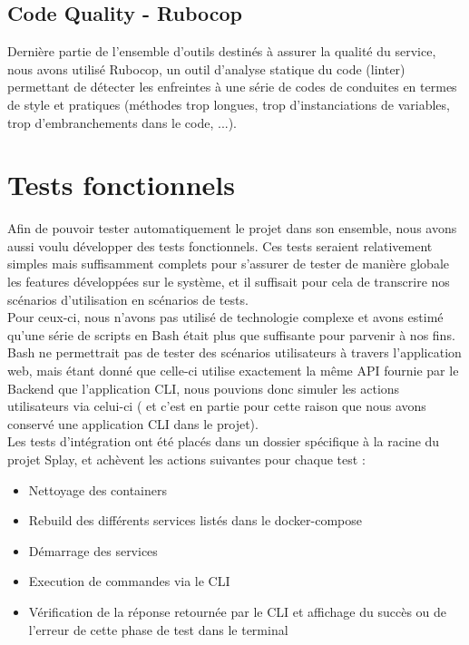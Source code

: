 \documentclass{eplmastersthesis}
\begin{document}
      \subsection{Code Quality - Rubocop}

        Dernière partie de l'ensemble d'outils destinés à assurer la qualité du
        service, nous avons utilisé Rubocop, un outil d'analyse statique du code
        (linter) permettant de détecter les enfreintes à une série de codes
        de conduites en termes de style et pratiques (méthodes trop longues,
        trop d'instanciations de variables, trop d'embranchements dans le code, ...).

    \section{Tests fonctionnels}

      Afin de pouvoir tester automatiquement le projet dans son ensemble, nous
      avons aussi voulu développer des tests fonctionnels. Ces tests seraient
      relativement simples mais suffisamment complets pour s'assurer de
      tester de manière globale les features développées sur le système, et
      il suffisait pour cela de transcrire nos scénarios d'utilisation en
      scénarios de tests.\\

      Pour ceux-ci, nous n'avons pas utilisé de technologie complexe et avons
      estimé qu'une série de scripts en Bash était plus que suffisante pour
      parvenir à nos fins. Bash ne permettrait pas de tester des scénarios
      utilisateurs à travers l'application web, mais étant donné que celle-ci
      utilise exactement la même API fournie par le Backend que l'application
      CLI, nous pouvions donc simuler les actions utilisateurs via celui-ci (
      et c'est en partie pour cette raison que nous avons conservé une
      application CLI dans le projet).\\

      Les tests d'intégration ont été placés dans un dossier spécifique à la
      racine du projet Splay, et achèvent les actions suivantes pour chaque
      test : \\

      \begin{itemize}
        \item Nettoyage des containers
        \item Rebuild des différents services listés dans le docker-compose
        \item Démarrage des services
        \item Execution de commandes via le CLI
        \item Vérification de la réponse retournée par le CLI et affichage du
        succès ou de l'erreur de cette phase de test dans le terminal
      \end{itemize}
\end{document}
